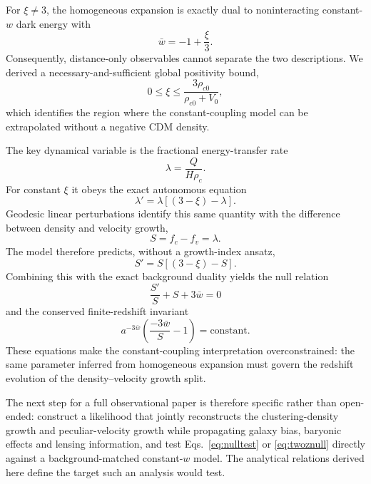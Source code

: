 \documentclass[11pt]{article}
\theoremstyle{remark}
\begin{document}
For $\xi\neq3$, the homogeneous expansion is exactly dual to noninteracting constant-$w$ dark energy with
\begin{equation}
    \bar w=-1+\frac{\xi}{3}.
\end{equation}
Consequently, distance-only observables cannot separate the two descriptions.  We derived a necessary-and-sufficient global positivity bound,
\begin{equation}
    0\le\xi\le
    \frac{3\rho_{c0}}{\rho_{c0}+V_0},
\end{equation}
which identifies the region where the constant-coupling model can be extrapolated without a negative CDM density.

The key dynamical variable is the fractional energy-transfer rate
\begin{equation}
    \lambda=\frac{Q}{H\rho_c}.
\end{equation}
For constant $\xi$ it obeys the exact autonomous equation
\begin{equation}
    \lambda'=\lambda[(3-\xi)-\lambda].
\end{equation}
Geodesic linear perturbations identify this same quantity with the difference between density and velocity growth,
\begin{equation}
    S=f_c-f_v=\lambda.
\end{equation}
The model therefore predicts, without a growth-index ansatz,
\begin{equation}
    S'=S[(3-\xi)-S].
\end{equation}
Combining this with the exact background duality yields the null relation
\begin{equation}
    \boxed{\frac{S'}{S}+S+3\bar w=0}
\end{equation}
and the conserved finite-redshift invariant
\begin{equation}
    \boxed{
    a^{-3\bar w}
    \left(\frac{-3\bar w}{S}-1\right)
    =\mathrm{constant}.}
\end{equation}
These equations make the constant-coupling interpretation overconstrained: the same parameter inferred from homogeneous expansion must govern the redshift evolution of the density--velocity growth split.

The next step for a full observational paper is therefore specific rather than open-ended: construct a likelihood that jointly reconstructs the clustering-density growth and peculiar-velocity growth while propagating galaxy bias, baryonic effects and lensing information, and test Eqs.~\eqref{eq:nulltest} or \eqref{eq:twoznull} directly against a background-matched constant-$w$ model.  The analytical relations derived here define the target such an analysis would test.
\end{document}
